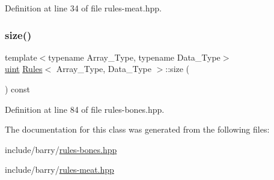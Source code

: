 Definition at line 34 of file rules-\/meat.\+hpp.

\mbox{\label{class_rules_a2f230f733e9936443af660bc890610ef}} 
\subsubsection{\texorpdfstring{size()}{size()}}
{\footnotesize\ttfamily template$<$typename Array\+\_\+\+Type, typename Data\+\_\+\+Type$>$ \\
\hyperlink{typedefs_8hpp_a91ad9478d81a7aaf2593e8d9c3d06a14}{uint} \hyperlink{class_rules}{Rules}$<$ Array\+\_\+\+Type, Data\+\_\+\+Type $>$\+::size (\begin{DoxyParamCaption}{ }\end{DoxyParamCaption}) const\hspace{0.3cm}{\ttfamily [inline]}}



Definition at line 84 of file rules-\/bones.\+hpp.



The documentation for this class was generated from the following files\+:\begin{DoxyCompactItemize}
\item 
include/barry/\hyperlink{rules-bones_8hpp}{rules-\/bones.\+hpp}\item 
include/barry/\hyperlink{rules-meat_8hpp}{rules-\/meat.\+hpp}\end{DoxyCompactItemize}
